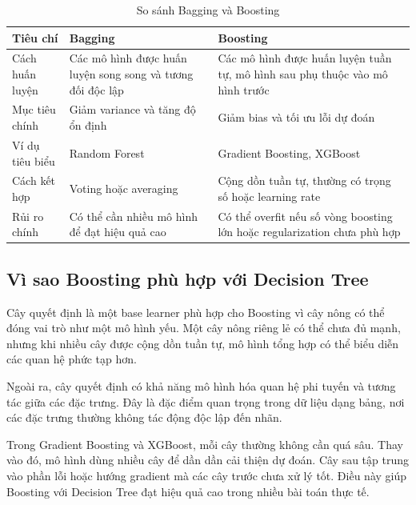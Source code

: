 \begin{table}[htbp]
    \centering
    \caption{So sánh Bagging và Boosting}
    \label{tab:bagging_boosting}
    \begin{tabular}{p{3.2cm}p{6.0cm}p{6.0cm}}
        \toprule
        \textbf{Tiêu chí} & \textbf{Bagging} & \textbf{Boosting} \\
        \midrule
        Cách huấn luyện 
        & Các mô hình được huấn luyện song song và tương đối độc lập 
        & Các mô hình được huấn luyện tuần tự, mô hình sau phụ thuộc vào mô hình trước \\

        Mục tiêu chính 
        & Giảm variance và tăng độ ổn định 
        & Giảm bias và tối ưu lỗi dự đoán \\

        Ví dụ tiêu biểu 
        & Random Forest 
        & Gradient Boosting, XGBoost \\

        Cách kết hợp 
        & Voting hoặc averaging 
        & Cộng dồn tuần tự, thường có trọng số hoặc learning rate \\

        Rủi ro chính 
        & Có thể cần nhiều mô hình để đạt hiệu quả cao 
        & Có thể overfit nếu số vòng boosting lớn hoặc regularization chưa phù hợp \\
        \bottomrule
    \end{tabular}
\end{table}

\subsection{Vì sao Boosting phù hợp với Decision Tree}

Cây quyết định là một base learner phù hợp cho Boosting vì cây nông có thể đóng vai trò như một mô hình yếu. Một cây nông riêng lẻ có thể chưa đủ mạnh, nhưng khi nhiều cây được cộng dồn tuần tự, mô hình tổng hợp có thể biểu diễn các quan hệ phức tạp hơn.

Ngoài ra, cây quyết định có khả năng mô hình hóa quan hệ phi tuyến và tương tác giữa các đặc trưng. Đây là đặc điểm quan trọng trong dữ liệu dạng bảng, nơi các đặc trưng thường không tác động độc lập đến nhãn.

Trong Gradient Boosting và XGBoost, mỗi cây thường không cần quá sâu. Thay vào đó, mô hình dùng nhiều cây để dần dần cải thiện dự đoán. Cây sau tập trung vào phần lỗi hoặc hướng gradient mà các cây trước chưa xử lý tốt. Điều này giúp Boosting với Decision Tree đạt hiệu quả cao trong nhiều bài toán thực tế.


